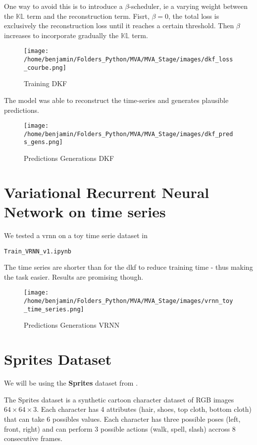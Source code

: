 One way to avoid this is to introduce a $\beta$-scheduler, ie a varying weight between the $\mathbb{KL}$ term and the reconstruction term. Fisrt, $\beta=0$, 
the total loss is exclusively the reconstruction loss until it reaches a certain threshold. Then $\beta$ increases to incorporate gradually the $\mathbb{KL}$ term.

\begin{figure}[H]
    \centering
    \texttt{[image: /home/benjamin/Folders\_Python/MVA/MVA\_Stage/images/dkf\_loss\_courbe.png]}
    \caption{Training DKF}
    \label{fig:Training DKF}
\end{figure}

The model was able to reconstruct the time-series and generates plausible predictions.

\begin{figure}[H]
    \centering
    \texttt{[image: /home/benjamin/Folders\_Python/MVA/MVA\_Stage/images/dkf\_preds\_gens.png]}
    \caption{Predictions Generations DKF}
    \label{fig:Predictions Generations DKF}
\end{figure}

\section{Variational Recurrent Neural Network on time series}

We tested a \gls{vrnn} on a toy time serie dataset in
\begin{verbatim}
Train_VRNN_v1.ipynb
\end{verbatim}
The time series are shorter than for the \gls{dkf} to reduce training time - thus making the task easier. Results are promising though.

\begin{figure}[H]
    \centering
    \texttt{[image: /home/benjamin/Folders\_Python/MVA/MVA\_Stage/images/vrnn\_toy\_time\_series.png]}
    \caption{Predictions Generations VRNN}
    \label{fig:Predictions Generations VRNN}
\end{figure}


\section{Sprites Dataset}

We will be using the \textbf{Sprites} dataset from \cite{li_disentangled_2018}.

The Sprites dataset is a synthetic cartoon character dataset of RGB images $64 \times 64 \times 3$. Each character has 4 attributes 
(hair, shoes, top cloth, bottom cloth) that can take 6 possibles values. Each character has three possible poses (left, front, right) 
and can perform 3 possible actions (walk, spell, slash) accross 8 consecutive frames.

